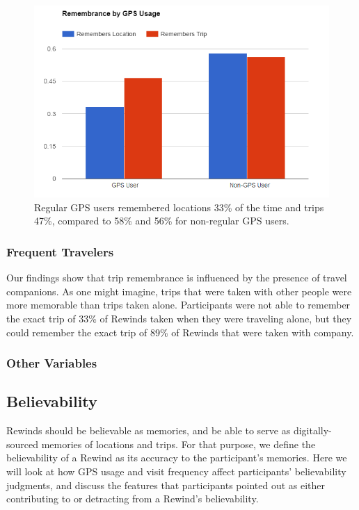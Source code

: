 \documentclass{sigchi}
\begin{document}
\begin{figure}
	\centering
	\includegraphics[width=1\linewidth]{GPS_remembrance_2}
	\caption{Regular GPS users remembered locations 33\% of the time and trips 47\%, compared to 58\% and 56\% for non-regular GPS users.}
	\label{fig:gpsmemory}
\end{figure}

\subsubsection{Frequent Travelers}
Our findings show that trip remembrance is influenced by the presence of travel companions. As one might imagine, trips that were taken with other people were more memorable than trips taken alone. Participants were not able to remember the exact trip of 33\% of Rewinds taken when they were traveling alone, but they could remember the exact trip of 89\% of Rewinds that were taken with company.

\subsubsection{Other Variables}

\subsection{Believability}
Rewinds should be believable as memories, and be able to serve as digitally-sourced memories of locations and trips. For that purpose, we define the believability of a Rewind as its accuracy to the participant's memories. Here we will look at how GPS usage and visit frequency affect participants' believability judgments, and discuss the features that participants pointed out as either contributing to or detracting from a Rewind's believability.
\end{document}

